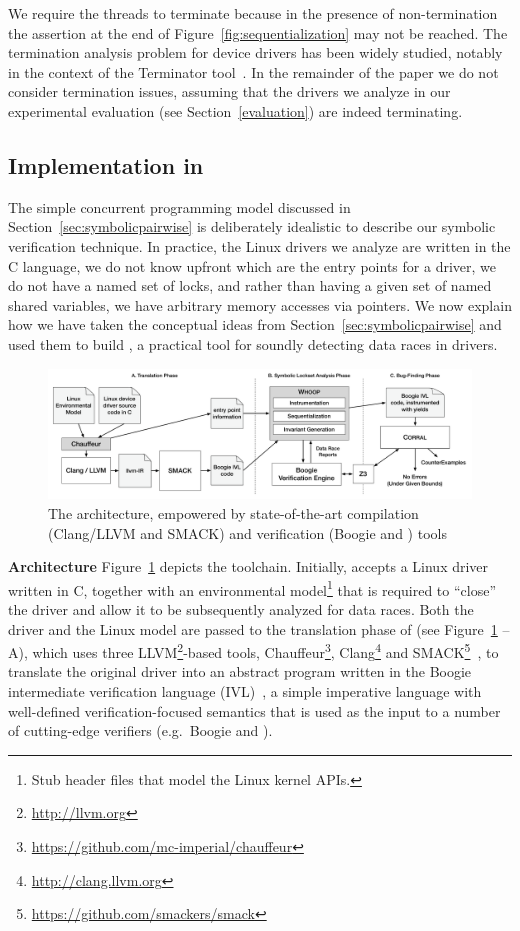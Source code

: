 We require the threads to terminate because in the presence of non-termination the assertion at the end of Figure~\ref{fig:sequentialization} may not be reached.  The termination analysis problem for device drivers has been widely studied, notably in the context of the Terminator tool~\cite{cook2006termination}. In the remainder of the paper we do not consider termination issues, assuming that the drivers we analyze in our experimental evaluation (see Section~\ref{evaluation}) are indeed terminating.

\subsection{Implementation in \whoop}
\label{sec:implementation}

The simple concurrent programming model discussed in Section~\ref{sec:symbolicpairwise} is deliberately idealistic to describe our symbolic verification technique. In practice, the Linux drivers we analyze are written in the C language, we do not know upfront which are the entry points for a driver, we do not have a named set of locks, and rather than having a given set of named shared variables, we have arbitrary memory accesses via pointers. We now explain how we have taken the conceptual ideas from Section~\ref{sec:symbolicpairwise} and used them to build \whoop, a practical tool for soundly detecting data races in drivers.

\begin{figure}
\centering
\includegraphics[width=.99\linewidth]{img/whoop.pdf}
\caption{The \whoop architecture, empowered by state-of-the-art compilation (Clang/LLVM and SMACK) and verification (Boogie and \corral) tools}
\label{fig:whoop}
\end{figure}

\medskip\noindent\textbf{Architecture }
%
Figure~\ref{fig:whoop} depicts the \whoop toolchain. Initially, \whoop accepts a Linux driver written in C, together with an environmental model\footnote{Stub header files that model the Linux kernel APIs.} that is required to ``close'' the driver and allow it to be subsequently analyzed for data races. Both the driver and the Linux model are passed to the translation phase of \whoop (see Figure~\ref{fig:whoop} -- A), which uses three LLVM\footnote{\url{http://llvm.org}}-based tools, Chauffeur\footnote{\url{https://github.com/mc-imperial/chauffeur}}, Clang\footnote{\url{http://clang.llvm.org}} and SMACK\footnote{\url{https://github.com/smackers/smack}}~\cite{rakamaric2014smack}, to translate the original driver into an abstract program written in the Boogie intermediate verification language (IVL)~\cite{deline2005boogiepl}, a simple imperative language with well-defined verification-focused semantics that is used as the input to a number of cutting-edge verifiers (e.g.\ Boogie and \corral).

